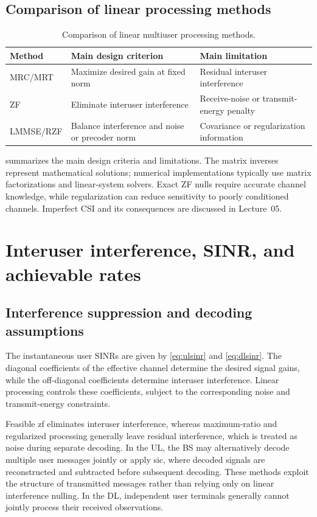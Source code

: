 \subsection{Comparison of linear processing methods}
\begin{table}[ht]
	\centering
	\small
	\caption{Comparison of linear multiuser processing methods.}
	\label{tab:mu-processing}
	\begin{tabular}{p{23mm}p{54mm}p{63mm}}
		\toprule
		Method & Main design criterion & Main limitation\\
		\midrule
		MRC/MRT & Maximize desired gain at fixed norm & Residual interuser interference\\
		ZF & Eliminate interuser interference & Receive-noise or transmit-energy penalty\\
		LMMSE/RZF & Balance interference and noise or precoder norm & Covariance or regularization information\\
		\bottomrule
	\end{tabular}
\end{table}
 summarizes the main design criteria and limitations. The matrix inverses represent mathematical solutions; numerical implementations typically use matrix factorizations and linear-system solvers. Exact ZF nulls require accurate channel knowledge, while regularization can reduce sensitivity to poorly conditioned channels. Imperfect CSI and its consequences are discussed in Lecture~05.



\section{Interuser interference, SINR, and achievable rates}
\label{sec:rates}

\subsection{Interference suppression and decoding assumptions}
The instantaneous user SINRs are given by \eqref{eq:ulsinr} and \eqref{eq:dlsinr}. The diagonal coefficients of the effective channel determine the desired signal gains, while the off-diagonal coefficients determine interuser interference. Linear processing controls these coefficients, subject to the corresponding noise and transmit-energy constraints.

Feasible \ac{zf} eliminates interuser interference, whereas maximum-ratio and regularized processing generally leave residual interference, which is treated as noise during separate decoding. In the UL, the BS may alternatively decode multiple user messages jointly or apply \ac{sic}, where decoded signals are reconstructed and subtracted before subsequent decoding. These methods exploit the structure of transmitted messages rather than relying only on linear interference nulling. In the DL, independent user terminals generally cannot jointly process their received observations.

